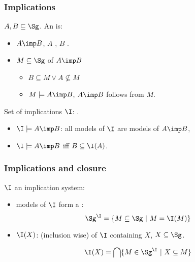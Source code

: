 \begin{frame}
\frametitle{Implications}

$A, B \subseteq \Sg$. An  is:
\begin{itemize}
	\item $A \imp B$, $A$ , $B$ .
	\item $M \subseteq \Sg$  of $A \imp B$
		\begin{itemize}
			\item[\belemp{$\triangleright$}] $B \subseteq M \lor A \nsubseteq M$ \quad {}
			\item[\belemp{$\triangleright$}] $M \models A \imp B$, $A \imp B$ follows from $M$.
		\end{itemize}

\end{itemize}

\vspace{1.2em}

Set of implications $\I$: .
\begin{itemize}
	\item $\I \models A \imp B$: all models of $\I$ are models of $A \imp B$,
	\item $\I \models A \imp B$ iff $B \subseteq \I(A)$.
\end{itemize}

\end{frame}


\begin{frame}
\frametitle{Implications and closure}

$\I$ an implication system:
\begin{itemize}
\item models of $\I$ form a :
\[ \Sg^{\I} = \{ M \subseteq \Sg \ | \ M = \I(M) \} \]

\vspace{1.2em}

\item {} $\I(X)$:  (inclusion wise) of $\I$ containing $X$, $X \subseteq \Sg$. 

\[ \I(X) = \bigcap \{ M \in \Sg^{\I} \ | \ X \subseteq M \} \]
\end{itemize}

\end{frame}

